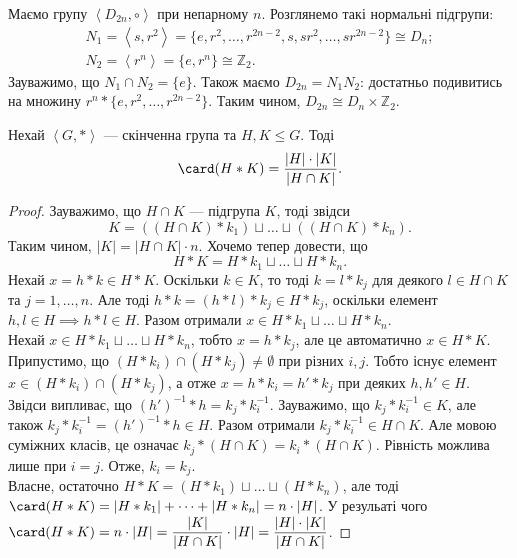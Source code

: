\documentclass{math_library}
\begin{document}
\begin{example}
Маємо групу $\left<D_{2n}, \circ \right>$ при непарному $n$. Розглянемо такі нормальні підгрупи:
\begin{align*}
N_1 = \left<s,r^2\right> = \{e,r^2,\dots,r^{2n-2},s,sr^2,\dots,sr^{2n-2}\} \cong D_n;\\
N_2 = \left< r^n \right> = \{e,r^n\} \cong \mathbb{Z}_2.
\end{align*}
Зауважимо, що $N_1 \cap N_2 = \{e\}$. Також маємо $D_{2n} = N_1N_2$: достатньо подивитись на множину $r^n * \{e,r^2,\dots,r^{2n-2}\}$. Таким чином, $D_{2n} \cong D_n \times \mathbb{Z}_2$.
\end{example}

\begin{theorem}
Нехай $\left<G,*\right>$ --- скінченна група та $H,K \leq G$. Тоді \begin{align*}
\card(H*K) = \dfrac{|H| \cdot |K|}{|H \cap K|}.
\end{align*}
\end{theorem}

\begin{proof}
Зауважимо, що $H \cap K$ --- підгрупа $K$, тоді звідси 
\[
K = ((H \cap K)*k_1) \sqcup \dots \sqcup ((H \cap K)*k_n).
\]
Таким чином, $|K| = |H \cap K| \cdot n$. Хочемо тепер довести, що \[ 
H*K = H*k_1 \sqcup \dots \sqcup H*k_n.
\]
Нехай $x = h*k \in H*K$. Оскільки $k \in K$, то тоді $k = l*k_j$ для деякого $l \in H \cap K$ та $j = 1,\dots,n$. Але тоді $h*k = (h*l)*k_j \in H*k_j$, оскільки елемент $h,l \in H \implies h*l \in H$. Разом отримали $x \in H*k_1 \sqcup \dots \sqcup H*k_n$.\\
Нехай $x \in H*k_1 \sqcup \dots \sqcup H*k_n$, тобто $x = h*k_j$, але це автоматично $x \in H*K$.\\
Припустимо, що $(H*k_i) \cap (H*k_j) \neq \emptyset$ при різних $i,j$. Тобто існує елемент $x \in (H*k_i) \cap (H*k_j)$, а отже $x = h*k_i = h'*k_j$ при деяких $h,h' \in H$. Звідси випливає, що $(h')^{-1}*h = k_j*k_i^{-1}$. Зауважимо, що $k_j * k_i^{-1} \in K$, але також $k_j * k_i^{-1} = (h')^{-1}*h \in H$. Разом отримали $k_j * k_i^{-1} \in H \cap K$. Але мовою суміжних класів, це означає $k_j * (H \cap K) = k_i * (H \cap K)$. Рівність можлива лише при $i = j$. Отже, $k_i = k_j$.\\
Власне, остаточно $H*K = (H*k_1) \sqcup \dots \sqcup (H*k_n)$, але тоді $\card(H*K) = |H*k_1| + \dots + |H*k_n| = n \cdot |H|$. У резульаті чого $\card(H*K) = n \cdot |H| = \dfrac{|K|}{|H \cap K|} \cdot |H| = \dfrac{|H| \cdot |K|}{|H \cap K|}$.
\end{proof}
\end{document}
